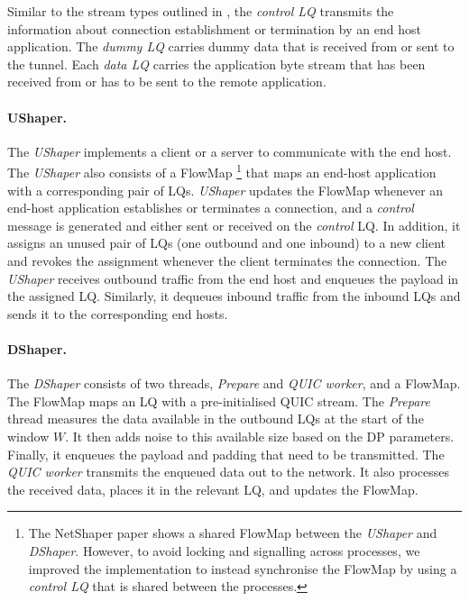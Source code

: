 Similar to the stream types outlined in , the \textit{control LQ} transmits the information about connection establishment or termination by an end host application. 
The \textit{dummy LQ} carries dummy data that is received from or sent to the tunnel.
Each \textit{data LQ} carries the application byte stream that has been received from or has to be sent to the remote application.


\paragraph{UShaper.}
The \textit{UShaper} implements a client or a server to communicate with the end host.
The \textit{UShaper} also consists of a FlowMap 
\footnote{The NetShaper paper shows a shared FlowMap between the \textit{UShaper} and \textit{DShaper}. However, to avoid locking and signalling across processes, we improved the implementation to instead synchronise the FlowMap by using a \textit{control LQ} that is shared between the processes.}
that maps an end-host application with a corresponding pair of LQs.
\textit{UShaper} updates the FlowMap whenever an end-host application establishes or terminates a connection, and a \textit{control} message is generated and either sent or received on the \textit{control} LQ.
In addition, it assigns an unused pair of LQs (one outbound and one inbound) to a new client and revokes the assignment whenever the client terminates the connection.
The \textit{UShaper} receives outbound traffic from the end host and enqueues the payload in the assigned LQ.
Similarly, it dequeues inbound traffic from the inbound LQs and sends it to the corresponding end hosts.

\paragraph{DShaper.}
The \textit{DShaper} consists of two threads, \textit{Prepare} and \textit{QUIC worker}, and a FlowMap.
The FlowMap maps an LQ with a pre-initialised QUIC stream.
The \textit{Prepare} thread measures the data available in the outbound LQs at the start of the window $W$.
It then adds noise to this available size based on the DP parameters.
Finally, it enqueues the payload and padding that need to be transmitted.
The \textit{QUIC worker} transmits the enqueued data out to the network.
It also processes the received data, places it in the relevant LQ, and updates the FlowMap.

